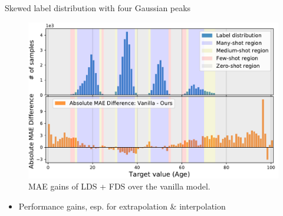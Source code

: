 \begin{frame}{Skewed label distribution with four Gaussian peaks}
	\begin{figure}[h]
		\includegraphics[width=0.7\linewidth]{images/interp_extrap_diff_peak4.pdf}
		\caption{MAE gains of LDS + FDS over the vanilla model.}
	\end{figure}
	\begin{itemize}
		\item Performance gains, esp. for extrapolation \& interpolation
	\end{itemize}
\end{frame}

